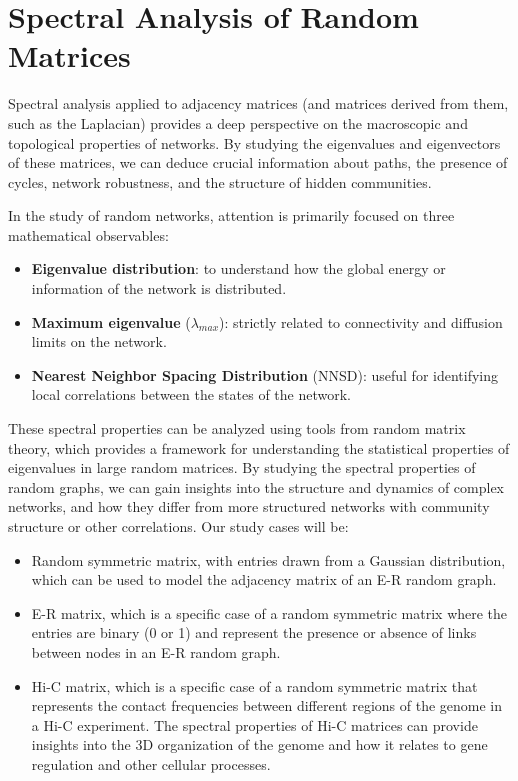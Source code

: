 \chapter{Spectral Analysis of Random Matrices}

Spectral analysis applied to adjacency matrices (and matrices derived from them, such as the Laplacian) provides a deep perspective on the macroscopic and topological properties of networks. By studying the eigenvalues and eigenvectors of these matrices, we can deduce crucial information about paths, the presence of cycles, network robustness, and the structure of hidden communities.

In the study of random networks, attention is primarily focused on three mathematical observables:
\begin{itemize}
    \item \textbf{Eigenvalue distribution}: to understand how the global energy or information of the network is distributed.
    \item \textbf{Maximum eigenvalue} (\( \lambda_{max} \)): strictly related to connectivity and diffusion limits on the network.
    \item \textbf{Nearest Neighbor Spacing Distribution} (NNSD): useful for identifying local correlations between the states of the network.
\end{itemize}

These spectral properties can be analyzed using tools from random matrix theory, which provides a framework for understanding the statistical properties of eigenvalues in large random matrices. By studying the spectral properties of random graphs, we can gain insights into the structure and dynamics of complex networks, and how they differ from more structured networks with community structure or other correlations. Our study cases will be:
\begin{itemize}
    \item Random symmetric matrix, with entries drawn from a Gaussian distribution, which can be used to model the adjacency matrix of an E-R random graph.
    \item E-R matrix, which is a specific case of a random symmetric matrix where the entries are binary (0 or 1) and represent the presence or absence of links between nodes in an E-R random graph.
    \item Hi-C matrix, which is a specific case of a random symmetric matrix that represents the contact frequencies between different regions of the genome in a Hi-C experiment. The spectral properties of Hi-C matrices can provide insights into the 3D organization of the genome and how it relates to gene regulation and other cellular processes.
\end{itemize}

